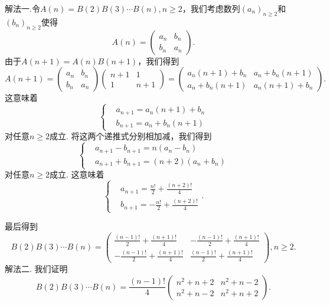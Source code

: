 \begin{solution}
  {\kaishu 解法一.}令$A(n)=B(2)B(3)\cdots B(n),n\ge2$，我们考虑数列$(a_n)_{n\ge2}$和$(b_n)_{n\ge2}$使得
  \[
    A(n) = \begin{pmatrix}
      a_n & b_n \\
      b_n & a_n
    \end{pmatrix}.
  \]
  由于$A(n+1)=A(n)B(n+1)$，我们得到
  \[
    A(n+1) = \begin{pmatrix}
      a_n & b_n \\
      b_n & a_n
    \end{pmatrix} \begin{pmatrix}
      n + 1 & 1 \\
      1 & n + 1
    \end{pmatrix} = \begin{pmatrix}
      a_n(n+1) + b_n & a_n + b_n(n+1) \\
      a_n + b_n(n+1) & a_n(n+1) + b_n
    \end{pmatrix}.
  \]
  这意味着
  \[
    \left\{
      \begin{aligned}
        & a_{n+1} = a_n(n+1) + b_n \\
        & b_{n+1} = a_n + b_n(n+1)
      \end{aligned}
    \right.
  \]
  对任意$n\ge2$成立. 将这两个递推式分别相加减，我们得到
  \[
    \left\{
      \begin{aligned}
        & a_{n+1} - b_{n+1} = n(a_n - b_n) \\
        & a_{n+1} + b_{n+1} = (n+2)(a_n + b_n)
      \end{aligned}
    \right.
  \]
  对任意$n\ge2$成立. 这意味着
  \[
    \left\{
      \begin{aligned}
        & a_{n+1} = \frac{n!}2 + \frac{(n+2)!}4 \\
        & b_{n+1} = -\frac{n!}2 + \frac{(n+2)!}4
      \end{aligned}
    \right..
  \]

  最后得到
  \[
    B(2)B(3)\cdots B(n) = \begin{pmatrix}
      \frac{(n-1)!}2 + \frac{(n+1)!}4 &
      -\frac{(n-1)!}2 + \frac{(n+1)!}4 \\
      -\frac{(n-1)!}2 + \frac{(n+1)!}4 &
      \frac{(n-1)!}2 + \frac{(n+1)!}4
    \end{pmatrix},n\ge2.
  \]
  {\kaishu 解法二.} 我们证明
  \[
    B(2)B(3)\cdots B(n) = \frac{(n-1)!}4
    \begin{pmatrix}
      n^2 + n + 2 & n^2 + n - 2 \\
      n^2 + n - 2 & n^2 + n + 2
    \end{pmatrix}.
  \]


\end{solution}
